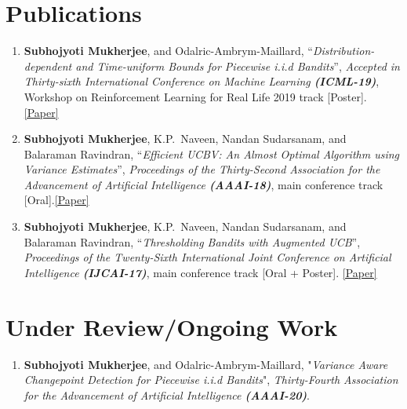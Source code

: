 \documentclass[margin,11pt]{res}
\begin{document}
\begin{resume}
\section{Publications}
\begin{enumerate}[leftmargin=*]
\item \textbf{Subhojyoti Mukherjee}, and Odalric-Ambrym-Maillard, ``\textit{Distribution-dependent and Time-uniform Bounds for Piecewise i.i.d Bandits}'', \textit{Accepted in Thirty-sixth International Conference on Machine Learning  \textbf{(ICML-19)}}, Workshop on Reinforcement Learning for Real Life 2019 track [Poster]. \href{https://openreview.net/forum?id=Ske_J_SrjE}{[Paper]}
\item \textbf{Subhojyoti Mukherjee}, K.P.~Naveen, Nandan Sudarsanam, and Balaraman Ravindran, ``\textit{Efficient UCBV: An Almost Optimal Algorithm using Variance Estimates}'', \textit{Proceedings of the Thirty-Second Association for the Advancement of Artificial Intelligence \textbf{(AAAI-18)}}, main conference track [Oral].\href{https://www.aaai.org/ocs/index.php/AAAI/AAAI18/paper/view/16111}{[Paper]}
\item \textbf{Subhojyoti Mukherjee}, K.P.~Naveen, Nandan Sudarsanam, and Balaraman Ravindran, ``\textit{Thresholding Bandits with Augmented UCB}'', \textit{Proceedings of the Twenty-Sixth International Joint Conference on Artificial Intelligence \textbf{(IJCAI-17)}}, main conference track [Oral + Poster]. \href{https://www.ijcai.org/proceedings/2017/0350.pdf}{[Paper]}
\end{enumerate}

\section{Under Review/Ongoing Work}
\begin{enumerate}[leftmargin=*]
\item \textbf{Subhojyoti Mukherjee}, and Odalric-Ambrym-Maillard, "\textit{Variance Aware Changepoint Detection for Piecewise i.i.d Bandits}", \textit{Thirty-Fourth Association for the Advancement of Artificial Intelligence \textbf{(AAAI-20)}}. %
\end{enumerate}


\end{resume}
\end{document}
